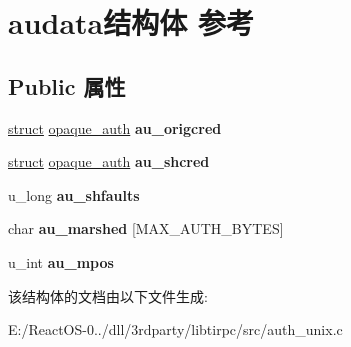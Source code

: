 \hypertarget{structaudata}{}\section{audata结构体 参考}
\label{structaudata}
\subsection*{Public 属性}
\begin{DoxyCompactItemize}
\item 
\mbox{\label{structaudata_aaa7eebca8bbea96d835544246f0fd25f}} 
\hyperlink{interfacestruct}{struct} \hyperlink{structopaque__auth}{opaque\+\_\+auth} {\bfseries au\+\_\+origcred}
\item 
\mbox{\label{structaudata_a87d29e287f2be48af86b89d38a882e4d}} 
\hyperlink{interfacestruct}{struct} \hyperlink{structopaque__auth}{opaque\+\_\+auth} {\bfseries au\+\_\+shcred}
\item 
\mbox{\label{structaudata_a923f8ee66f9d1ace4beb6bb5a7a8dfc4}} 
u\+\_\+long {\bfseries au\+\_\+shfaults}
\item 
\mbox{\label{structaudata_a138b5b03cd795ad8f9f755b0993deefd}} 
char {\bfseries au\+\_\+marshed} \mbox{[}M\+A\+X\+\_\+\+A\+U\+T\+H\+\_\+\+B\+Y\+T\+ES\mbox{]}
\item 
\mbox{\label{structaudata_a138aea55f1cdd4053683c189f7d9bc07}} 
u\+\_\+int {\bfseries au\+\_\+mpos}
\end{DoxyCompactItemize}


该结构体的文档由以下文件生成\+:\begin{DoxyCompactItemize}
\item 
E\+:/\+React\+O\+S-\/0../dll/3rdparty/libtirpc/src/auth\+\_\+unix.\+c\end{DoxyCompactItemize}
